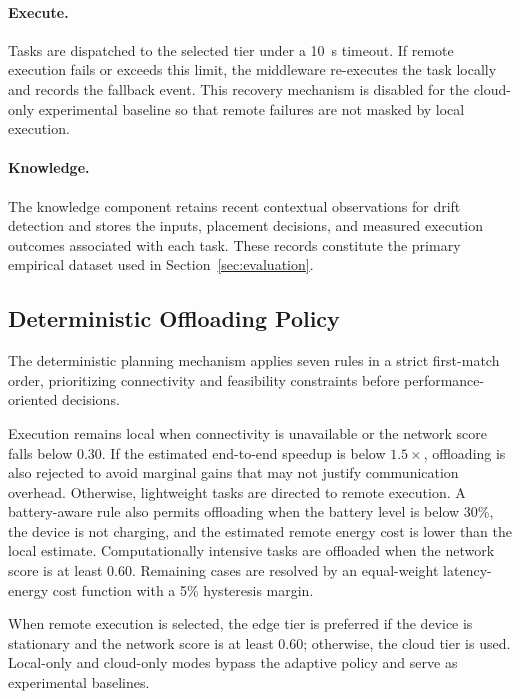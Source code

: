 \paragraph{Execute.}
Tasks are dispatched to the selected tier under a 10~s timeout. If remote
execution fails or exceeds this limit, the middleware re-executes the task
locally and records the fallback event. This recovery mechanism is disabled
for the cloud-only experimental baseline so that remote failures are not
masked by local execution.

\paragraph{Knowledge.}
The knowledge component retains recent contextual observations for drift
detection and stores the inputs, placement decisions, and measured execution
outcomes associated with each task. These records constitute the primary
empirical dataset used in Section~\ref{sec:evaluation}.


\subsection{Deterministic Offloading Policy}
\label{subsec:rule_policy}

The deterministic planning mechanism applies seven rules in a strict
first-match order, prioritizing connectivity and feasibility constraints before
performance-oriented decisions.

Execution remains local when connectivity is unavailable or the network score
falls below 0.30. If the estimated end-to-end speedup is below
$1.5\times$, offloading is also rejected to avoid marginal gains that may not
justify communication overhead. Otherwise, lightweight tasks are directed to
remote execution. A battery-aware rule also permits offloading when the battery
level is below 30\%, the device is not charging, and the estimated remote
energy cost is lower than the local estimate. Computationally intensive tasks
are offloaded when the network score is at least 0.60. Remaining cases are
resolved by an equal-weight latency-energy cost function with a 5\%
hysteresis margin.

When remote execution is selected, the edge tier is preferred if the device is
stationary and the network score is at least 0.60; otherwise, the cloud tier is
used. Local-only and cloud-only modes bypass the adaptive policy and serve as
experimental baselines.

